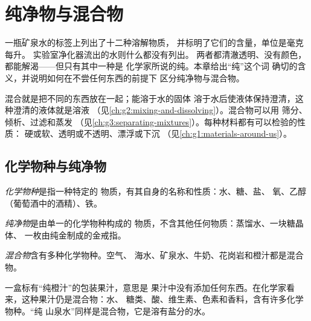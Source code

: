 \chapter{纯净物与混合物}\label{ch:g6:pure-substances-and-mixtures}

一瓶矿泉水的标签上列出了十二种溶解物质，
并标明了它们的含量，单位是毫克每升。
实验室净化器流出的水则什么都没有列出。
两者都清澈透明、没有颜色，都能解渴——但只有其中一种是
化学家所说的纯。本章给出“纯”这个词
确切的含义，并说明如何在不尝任何东西的前提下
区分纯净物与混合物。

\begin{recall}
混合就是把不同的东西放在一起；能溶于水的固体
溶于水后使液体保持澄清，这种澄清的液体就是溶液
（见\cref{ch:g2:mixing-and-dissolving}）。混合物可以用
筛分、倾析、过滤和蒸发
（见\cref{ch:g3:separating-mixtures}）。每种材料都有可以检验的性质：
硬或软、透明或不透明、漂浮或下沉
（见\cref{ch:g1:materials-around-us}）。
\end{recall}

\section{化学物种与纯净物}

\begin{definition}[化学物种]\label{def:g6:pure-substances-and-mixtures:species}
\emph{化学物种}是指一种特定的
物质，有其自身的名称和性质：水、糖、盐、
氧、乙醇（葡萄酒中的酒精）、铁。
\end{definition}

\begin{definition}[纯净物]\label{def:g6:pure-substances-and-mixtures:pure-substance}
\emph{纯净物}是由单一的化学物种构成的
物质，不含其他任何物质：蒸馏水、一块糖晶体、
一枚由纯金制成的金戒指。
\end{definition}

\begin{definition}[混合物]\label{def:g6:pure-substances-and-mixtures:mixture}
\emph{混合物}含有多种化学物种。空气、
海水、矿泉水、牛奶、花岗岩和橙汁都是混合物。
\end{definition}

\begin{remark}[日常语言中的“纯”]\label{rem:g6:pure-substances-and-mixtures:everyday}
一盒标有“纯橙汁”的包装果汁，意思是
果汁中没有添加任何东西。在化学家看来，这种果汁仍是混合物：水、
糖类、酸、维生素、色素和香料，含有许多化学物种。“纯
山泉水”同样是混合物，它是溶有盐分的水。
\end{remark}

